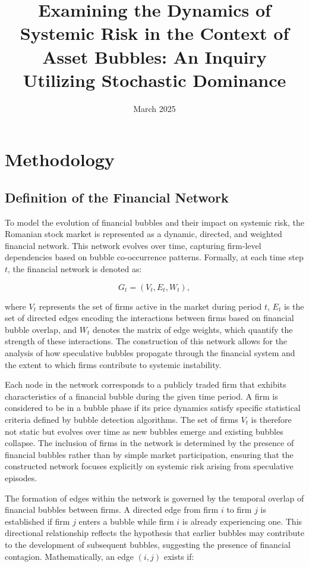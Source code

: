 \documentclass[preprint,12pt,authoryear]{elsarticle}
\title{Examining the Dynamics of Systemic Risk in the Context of Asset Bubbles: An Inquiry Utilizing Stochastic Dominance}
\date{March 2025}
\begin{document}
\maketitle

\section{Methodology}

\subsection{Definition of the Financial Network}  

To model the evolution of financial bubbles and their impact on systemic risk, the Romanian stock market is represented as a dynamic, directed, and weighted financial network. This network evolves over time, capturing firm-level dependencies based on bubble co-occurrence patterns. Formally, at each time step \( t \), the financial network is denoted as:

\[
G_t = (V_t, E_t, W_t),
\]

where \( V_t \) represents the set of firms active in the market during period \( t \), \( E_t \) is the set of directed edges encoding the interactions between firms based on financial bubble overlap, and \( W_t \) denotes the matrix of edge weights, which quantify the strength of these interactions. The construction of this network allows for the analysis of how speculative bubbles propagate through the financial system and the extent to which firms contribute to systemic instability.

Each node in the network corresponds to a publicly traded firm that exhibits characteristics of a financial bubble during the given time period. A firm is considered to be in a bubble phase if its price dynamics satisfy specific statistical criteria defined by bubble detection algorithms. The set of firms \( V_t \) is therefore not static but evolves over time as new bubbles emerge and existing bubbles collapse. The inclusion of firms in the network is determined by the presence of financial bubbles rather than by simple market participation, ensuring that the constructed network focuses explicitly on systemic risk arising from speculative episodes.

The formation of edges within the network is governed by the temporal overlap of financial bubbles between firms. A directed edge from firm \( i \) to firm \( j \) is established if firm \( j \) enters a bubble while firm \( i \) is already experiencing one. This directional relationship reflects the hypothesis that earlier bubbles may contribute to the development of subsequent bubbles, suggesting the presence of financial contagion. Mathematically, an edge \( (i, j) \) exists if:
\end{document}
